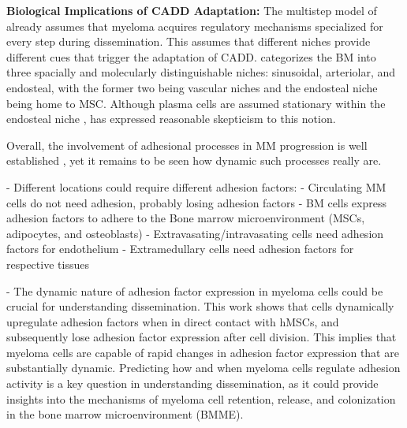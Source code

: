 \textbf{Biological Implications of \ac{CADD} Adaptation:} The multistep model
of \citet{zeissigTumourDisseminationMultiple2020} already assumes that myeloma
acquires regulatory mechanisms specialized for every step during dissemination.
This assumes that different niches provide different cues that trigger the
adaptation of \ac{CADD}. \citet{granataBoneMarrowNiches2022} categorizes the
\ac{BM} into three spacially and molecularly distinguishable niches: sinusoidal,
arteriolar, and endosteal, with the former two being vascular niches and the
endosteal niche being home to \ac{MSC}. Although plasma cells are assumed 
stationary within the endosteal niche
\cite{zehentmeierStaticDynamicComponents2014},
\citet{wilmoreHereThereAnywhere2017} has expressed reasonable skepticism to this
notion.

Overall, the involvement of adhesional processes in MM progression is well
established \cite{bouzerdanAdhesionMoleculesMultiple2022}, yet it remains to be
seen how dynamic such processes really are.


- Different locations could require different adhesion factors:
- Circulating MM cells do not need adhesion, probably losing adhesion factors
- BM cells express adhesion factors to adhere to the Bone marrow microenvironment (MSCs, adipocytes, and osteoblasts)
- Extravasating/intravasating cells need adhesion factors for endothelium
- Extramedullary cells need adhesion factors for respective tissues


- The dynamic nature of adhesion factor expression in myeloma cells could be
crucial for understanding dissemination. This work shows that \INA cells
dynamically upregulate adhesion factors when in direct contact with \acp{hMSC},
and subsequently lose adhesion factor expression after cell division. This
implies that myeloma cells are capable of rapid changes in adhesion factor
expression that are substantially dynamic. Predicting how and when myeloma
cells regulate adhesion activity is a key question in understanding
dissemination, as it could provide insights into the mechanisms of myeloma
cell retention, release, and colonization in the bone marrow microenvironment
(BMME).



